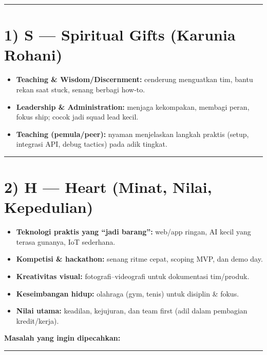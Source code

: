 \documentclass[
  letterpaper,
  DIV=11,
  numbers=noendperiod]{scrreprt}
\providecommand{\tightlist}{%
  \setlength{\itemsep}{0pt}\setlength{\parskip}{0pt}}
\begin{document}
\begin{center}\rule{0.5\linewidth}{0.5pt}\end{center}

\section{1) S --- Spiritual Gifts (Karunia
Rohani)}\label{s-spiritual-gifts-karunia-rohani}

\begin{itemize}
\tightlist
\item
  \textbf{Teaching \& Wisdom/Discernment:} cenderung menguatkan tim,
  bantu rekan saat stuck, senang berbagi how-to.
\item
  \textbf{Leadership \& Administration:} menjaga kekompakan, membagi
  peran, fokus ship; cocok jadi squad lead kecil.
\item
  \textbf{Teaching (pemula/peer):} nyaman menjelaskan langkah praktis
  (setup, integrasi API, debug tactics) pada adik tingkat.
\end{itemize}

\begin{center}\rule{0.5\linewidth}{0.5pt}\end{center}

\section{2) H --- Heart (Minat, Nilai,
Kepedulian)}\label{h-heart-minat-nilai-kepedulian}

\begin{itemize}
\item
  \textbf{Teknologi praktis yang ``jadi barang'':} web/app ringan, AI
  kecil yang terasa gunanya, IoT sederhana.
\item
  \textbf{Kompetisi \& hackathon:} senang ritme cepat, scoping MVP, dan
  demo day.
\item
  \textbf{Kreativitas visual:} fotografi--videografi untuk dokumentasi
  tim/produk.
\item
  \textbf{Keseimbangan hidup:} olahraga (gym, tenis) untuk disiplin \&
  fokus.
\item
  \textbf{Nilai utama:} keadilan, kejujuran, dan team first (adil dalam
  pembagian kredit/kerja).
\end{itemize}

\textbf{Masalah yang ingin dipecahkan:}

\begin{center}\rule{0.5\linewidth}{0.5pt}\end{center}
\end{document}
